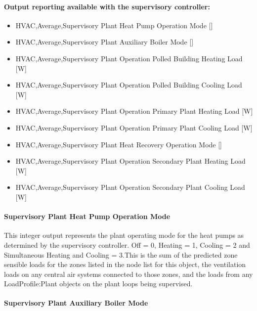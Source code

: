 \paragraph{Output reporting available with the supervisory controller:}\label{operation-scheme-heating-outputs-description}

\begin{itemize}
    \item
    HVAC,Average,Supervisory Plant Heat Pump Operation Mode  {[}{]}
    \item
    HVAC,Average,Supervisory Plant Auxiliary Boiler Mode  {[}{]}
    \item
    HVAC,Average,Supervisory Plant Operation Polled Building Heating Load  {[}W{]}
    \item
    HVAC,Average,Supervisory Plant Operation Polled Building Cooling Load  {[}W{]}
    \item 
    HVAC,Average,Supervisory Plant Operation Primary Plant Heating Load  {[}W{]}
    \item
    HVAC,Average,Supervisory Plant Operation Primary Plant Cooling Load  {[}W{]}
    \item
    HVAC,Average,Supervisory Plant Heat Recovery Operation Mode  {[}{]}
    \item 
    HVAC,Average,Supervisory Plant Operation Secondary Plant Heating Load  {[}W{]}
    \item
    HVAC,Average,Supervisory Plant Operation Secondary Plant Cooling Load  {[}W{]}
\end{itemize}

\paragraph{Supervisory Plant Heat Pump Operation Mode}\label{operation-scheme-outputs-supervisory-plant-operation-mode}

This integer output represents the plant operating mode for the heat pumps as determined by the supervisory controller. Off = 0, Heating = 1, Cooling = 2 and Simultaneous Heating and Cooling = 3.This is the sum of the predicted zone sensible loads for the zones listed in the node list for this object, the ventilation loads on any central air systems connected to those zones, and the loads from any LoadProfile:Plant objects on the plant loops being supervised.



\paragraph{Supervisory Plant Auxiliary Boiler Mode}\label{operation-scheme-outputs-boiler-operation-mode}

